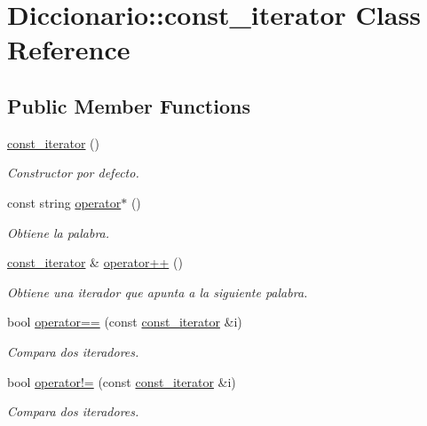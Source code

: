\hypertarget{classDiccionario_1_1const__iterator}{\section{Diccionario\-:\-:const\-\_\-iterator Class Reference}
\label{classDiccionario_1_1const__iterator}
}
\subsection*{Public Member Functions}
\begin{DoxyCompactItemize}
\item 
\hypertarget{classDiccionario_1_1const__iterator_a3a419733ec6ff764e55b3c485e0c9779}{\hyperlink{classDiccionario_1_1const__iterator_a3a419733ec6ff764e55b3c485e0c9779}{const\-\_\-iterator} ()}\label{classDiccionario_1_1const__iterator_a3a419733ec6ff764e55b3c485e0c9779}

\begin{DoxyCompactList}\small\item\em Constructor por defecto. \end{DoxyCompactList}\item 
\hypertarget{classDiccionario_1_1const__iterator_a5aa87cb0d3931aed7a5c5d414cd64d1b}{const string \hyperlink{classDiccionario_1_1const__iterator_a5aa87cb0d3931aed7a5c5d414cd64d1b}{operator$\ast$} ()}\label{classDiccionario_1_1const__iterator_a5aa87cb0d3931aed7a5c5d414cd64d1b}

\begin{DoxyCompactList}\small\item\em Obtiene la palabra. \end{DoxyCompactList}\item 
\hypertarget{classDiccionario_1_1const__iterator_a53602562e7a364eed5f04b8d9cbae37e}{\hyperlink{classDiccionario_1_1const__iterator}{const\-\_\-iterator} \& \hyperlink{classDiccionario_1_1const__iterator_a53602562e7a364eed5f04b8d9cbae37e}{operator++} ()}\label{classDiccionario_1_1const__iterator_a53602562e7a364eed5f04b8d9cbae37e}

\begin{DoxyCompactList}\small\item\em Obtiene una iterador que apunta a la siguiente palabra. \end{DoxyCompactList}\item 
bool \hyperlink{classDiccionario_1_1const__iterator_aa615fdf861394f1403a6866a572b3932}{operator==} (const \hyperlink{classDiccionario_1_1const__iterator}{const\-\_\-iterator} \&i)
\begin{DoxyCompactList}\small\item\em Compara dos iteradores. \end{DoxyCompactList}\item 
bool \hyperlink{classDiccionario_1_1const__iterator_a40604292e884b58685099223ed2ec587}{operator!=} (const \hyperlink{classDiccionario_1_1const__iterator}{const\-\_\-iterator} \&i)
\begin{DoxyCompactList}\small\item\em Compara dos iteradores. \end{DoxyCompactList}\end{DoxyCompactItemize}
